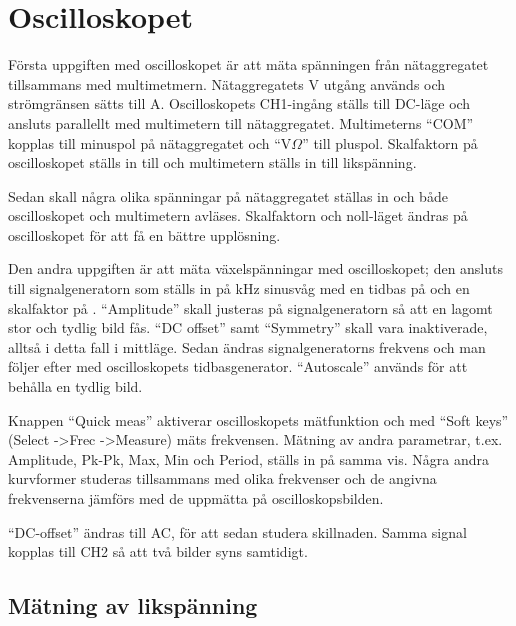 \documentclass[11pt,a4paper]{article}
\begin{document}
\section{Oscilloskopet}\label{}
Första uppgiften med oscilloskopet är att mäta spänningen från nätaggregatet tillsammans med multimetmern. Nätaggregatets \unit[6]{\si{\volt}} utgång används och strömgränsen sätts till \unit[0,1]{\si{\ampere}}. Oscilloskopets CH1-ingång ställs till DC-läge och ansluts parallellt med multimetern till nätaggregatet. Multimeterns ``COM'' kopplas till minuspol på nätaggregatet och ``\unit{\si{\volt}}$\Omega$'' till pluspol. Skalfaktorn på oscilloskopet ställs in till \unit[1]{} och multimetern ställs in till likspänning. \par Sedan skall några olika spänningar på nätaggregatet ställas in och både oscilloskopet och multimetern avläses. Skalfaktorn och noll-läget ändras på oscilloskopet för att få en bättre upplösning.
\\
\par Den andra uppgiften är att mäta växelspänningar med oscilloskopet; den ansluts till signalgeneratorn som ställs in på \unit[1]{\si{\kilo\hertz}} sinusvåg med en tidbas på \unit[500]{} och en skalfaktor på \unit[1]{}. ``Amplitude'' skall justeras på signalgeneratorn så att en lagomt stor och tydlig bild fås. ``DC offset'' samt ``Symmetry'' skall vara inaktiverade, alltså i detta fall i mittläge. Sedan ändras signalgeneratorns frekvens och man följer efter med oscilloskopets tidbasgenerator. ``Autoscale'' används för att behålla en tydlig bild.
\par Knappen ``Quick meas'' aktiverar oscilloskopets mätfunktion och med ``Soft keys'' (Select -\textgreater Frec -\textgreater Measure) mäts frekvensen. Mätning av andra para\-metrar, t.ex. Amplitude, Pk-Pk, Max, Min och Period, ställs in på samma vis. Några andra kurvformer studeras tillsammans med olika frekvenser och de angivna frekvenserna jämförs med de uppmätta på oscilloskopsbilden.
\par ``DC-offset'' ändras till AC, för att sedan studera skillnaden. Samma signal kopplas till CH2 så att två bilder syns samtidigt. 

\subsection{Mätning av likspänning}\label{meas_dc}
\end{document}
